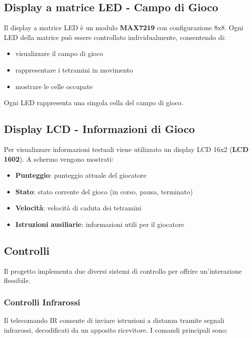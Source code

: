 \documentclass[a4paper, 12pt]{article}
\begin{document}
\subsection{Display a matrice LED - Campo di Gioco}
\label{subsec:display-matrice}
Il display a matrice LED è un modulo \textbf{MAX7219} con configurazione 8x8. Ogni LED della matrice può essere controllato individualmente, consentendo di:
\begin{itemize}
    \item visualizzare il campo di gioco
    \item rappresentare i tetramini in movimento
    \item mostrare le celle occupate
\end{itemize}

Ogni LED rappresenta una singola cella del campo di gioco.

\subsection{Display LCD - Informazioni di Gioco}
\label{subsec:display-lcd}
Per visualizzare informazioni testuali viene utilizzato un display LCD 16x2 (\textbf{LCD 1602}). A schermo vengono mostrati:
\begin{itemize}
    \item \textbf{Punteggio}: punteggio attuale del giocatore
    \item \textbf{Stato}: stato corrente del gioco (in corso, pausa, terminato)
    \item \textbf{Velocità}: velocità di caduta dei tetramini
    \item \textbf{Istruzioni ausiliarie}: informazioni utili per il giocatore
\end{itemize}

\subsection{Controlli}
\label{subsec:controlli}
Il progetto implementa due diversi sistemi di controllo per offrire un'interazione flessibile.

\subsubsection{Controlli Infrarossi}
\label{subsubsec:controlli-ir}
Il telecomando IR consente di inviare istruzioni a distanza tramite segnali infrarossi, decodificati da un apposito ricevitore. I comandi principali sono:
\end{document}
